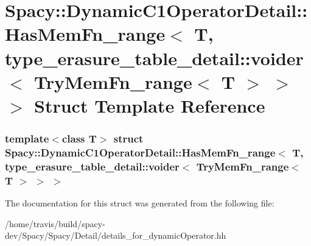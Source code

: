 \hypertarget{structSpacy_1_1DynamicC1OperatorDetail_1_1HasMemFn__range_3_01T_00_01type__erasure__table__detai43b3f98fec5bd224094b80986f58f19b}{\section{\-Spacy\-:\-:\-Dynamic\-C1\-Operator\-Detail\-:\-:\-Has\-Mem\-Fn\-\_\-range$<$ \-T, type\-\_\-erasure\-\_\-table\-\_\-detail\-:\-:voider$<$ \-Try\-Mem\-Fn\-\_\-range$<$ \-T $>$ $>$ $>$ \-Struct \-Template \-Reference}
\label{structSpacy_1_1DynamicC1OperatorDetail_1_1HasMemFn__range_3_01T_00_01type__erasure__table__detai43b3f98fec5bd224094b80986f58f19b}
}
\subsubsection*{template$<$class T$>$ struct Spacy\-::\-Dynamic\-C1\-Operator\-Detail\-::\-Has\-Mem\-Fn\-\_\-range$<$ T, type\-\_\-erasure\-\_\-table\-\_\-detail\-::voider$<$ Try\-Mem\-Fn\-\_\-range$<$ T $>$ $>$ $>$}



\-The documentation for this struct was generated from the following file\-:\begin{DoxyCompactItemize}
\item 
/home/travis/build/spacy-\/dev/\-Spacy/\-Spacy/\-Detail/details\-\_\-for\-\_\-dynamic\-Operator.\-hh\end{DoxyCompactItemize}
